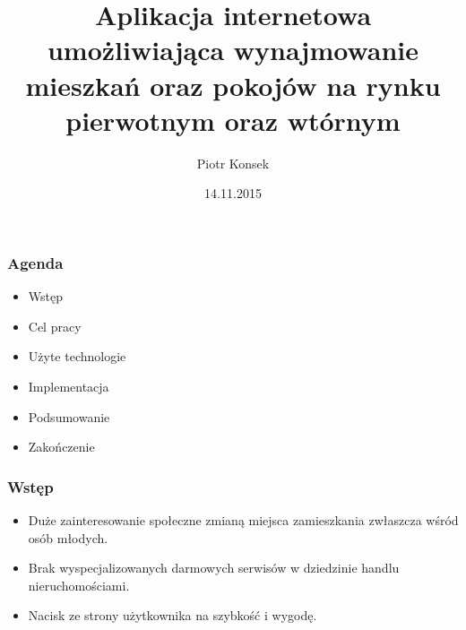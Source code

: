 \documentclass{beamer}
\title[Praca inżynierska]{Aplikacja internetowa umożliwiająca wynajmowanie mieszkań oraz pokojów na rynku pierwotnym oraz wtórnym}
\author[P. Konsek]{Piotr Konsek}
\date[2015]{14.11.2015}
\institute[AGH]
{Informatyka\\ 
Wydział Elektrotechniki Automatyki Informatyki i Inżynierii\\
Biomedycznej
}
\begin{document}
{
 \begin{frame}
   \titlepage
 \end{frame}
}



\begin{frame}
\frametitle{Agenda}
\begin{itemize}
\item Wstęp
\item Cel pracy
\item Użyte technologie
\item Implementacja
\item Podsumowanie
\item Zakończenie
\end{itemize}

\end{frame}


\begin{frame}
\frametitle{Wstęp}
\begin{itemize}
\item Duże zainteresowanie społeczne zmianą miejsca zamieszkania zwłaszcza wśród osób młodych.
\item Brak wyspecjalizowanych darmowych serwisów w dziedzinie handlu nieruchomościami.
\item Nacisk ze strony użytkownika na szybkość i wygodę.
\end{itemize}

\end{frame}
\end{document}
